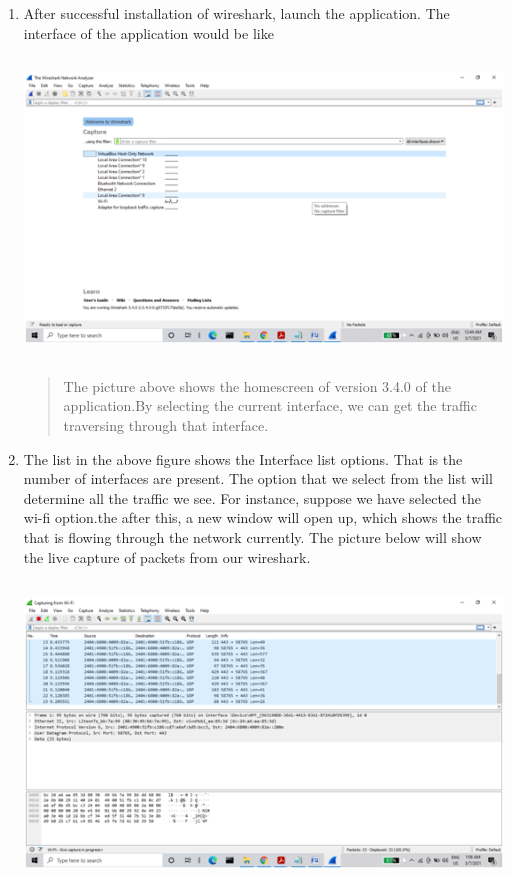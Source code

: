 \documentclass[a4paper,12pt]{report}
\begin{document}
\begin{enumerate}
\def\labelenumi{\arabic{enumi})}
\item
  After successful installation of wireshark, launch the application.
  The interface of the application would be like
  \begin{center}\includegraphics[width=5.56771in,height=3.13530in]{image6.png}\end{center}
  


\begin{quote}
The picture above shows the homescreen of version 3.4.0 of the
application.By selecting the current interface, we can get the traffic
traversing through that interface.
\end{quote}


\def\labelenumi{\arabic{enumi})}
\item
  The list in the above figure shows the Interface list options. That is
  the number of interfaces are present. The option that we select from
  the list will determine all the traffic we see. For instance, suppose
  we have selected the wi-fi option.the after this, a new window will
  open up, which shows the traffic that is flowing through the network
  currently. The picture below will show the live capture of packets
  from our wireshark.


\includegraphics[width=5.60628in,height=3.16538in]{image3.png}



\end{enumerate}
\end{document}
